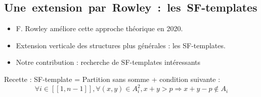 \documentclass[graphics]{beamer}
\begin{document}
\subsection{Une~extension~par~Rowley~:~les~SF-templates}
\begin{frame}
\begin{itemize}
\item F. Rowley améliore cette approche théorique en 2020.
\item Extension verticale des structures plus générales : les SF-templates.
\item Notre contribution : recherche de SF-templates intéressants
\end{itemize}
Recette : SF-template = Partition sans somme + condition suivante :
\[
\forall i \in [\![1, n-1]\!], \forall (x,y) \in A_i^2, x+y > p
\Longrightarrow x+y-p \notin A_i
\]
\end{frame}
\end{document}
